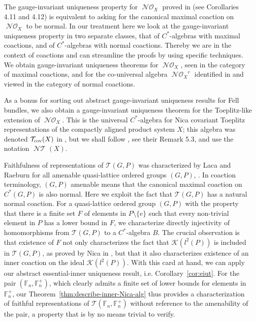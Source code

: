 \documentclass[12pt]{amsart}
\theoremstyle{plain}
\theoremstyle{remark}
\theoremstyle{definition}
\numberwithin{equation}{section}
\theoremstyle{plain}
\theoremstyle{definition}
\theoremstyle{remark}
\begin{document}
The gauge-invariant
uniqueness property for ${\operatorname{\mathcal{NO}}_{\!{X}}}$ proved in \cite{CLSV} (see Corollaries 4.11 and 4.12) is
equivalent to asking for the canonical maximal coaction on ${\operatorname{\mathcal{NO}}_{\!{X}}}$ to be normal. In our
treatment here we  look at the gauge-invariant uniqueness property in two separate
classes, that of $C^*$-algebras with maximal coactions, and of $C^*$-algebras
with normal coactions. Thereby we are in the context of coactions and
can streamline the proofs by using specific techniques.  We obtain gauge-invariant uniqueness
theorems for ${\operatorname{\mathcal{NO}}_{\!{X}}}$, seen in the category of maximal coactions, and
for the co-universal algebra ${\operatorname{\mathcal{NO}}_{\!{X}}}^{r}$ identified in \cite{CLSV} and viewed in the
category of normal coactions.

As a bonus for sorting out abstract gauge-invariant uniqueness results for Fell bundles,
we also obtain  a
gauge-invariant uniqueness theorem for the Toeplitz-like extension of ${\operatorname{\mathcal{NO}}_{\!{X}}}$.
This is the universal $C^*$-algebra for Nica covariant Toeplitz representations of
the compactly aligned product system $X$; this algebra was denoted ${{\mathcal T}_{\rm cov}}(X)$ in \cite{F}, but
we shall follow \cite{BanHLR}, see their Remark 5.3, and use the notation ${\operatorname{\mathcal{NT}}}(X)$.

Faithfulness of representations of ${\mathcal T}(G, P)$ was characterized by Laca and Raeburn for all
amenable quasi-lattice ordered groups $(G, P)$, \cite{LacR1}. In coaction terminology, $(G, P)$ amenable means
that the canonical maximal coaction on $C^*(G, P)$ is also normal.  Here we exploit the fact that ${\mathcal T}(G, P)$ has a natural normal coaction. For a
quasi-lattice ordered group $(G, P)$ with the property that there is a finite set $F$ of elements in
$P\setminus\{e\}$ such that every non-trivial element in $P$ has a  lower bound in $F$, we characterize
directly injectivity of homomorphisms from ${\mathcal T}(G, P)$ to a $C^*$-algebra $B$. The crucial observation is that existence
of $F$ not only characterizes the fact that ${\mathcal K}(l^2(P))$ is included in ${\mathcal T}(G, P)$, as proved by Nica
in \cite[Proposition 6.3]{N}, but that it also characterizes existence of an inner coaction
on the ideal ${\mathcal K}(l^2(P))$. With this card at hand, we can apply our abstract essential-inner uniqueness result, i.e.
Corollary~\ref{cor:eiut}. For the pair $({{\mathbb{{F}}}}_n, {{\mathbb{{F}}}}_n^+)$, which clearly admits a finite set of lower bounds for elements
in ${{\mathbb{{F}}}}_n^+$, our Theorem~\ref{thm:describe-inner-Nica-alg} thus provides a characterization of faithful representations
of ${\mathcal T}({{\mathbb{{F}}}}_n, {{\mathbb{{F}}}}_n^+)$ without reference to the amenability of the pair, a property that is by no means trivial to verify.
\end{document}
